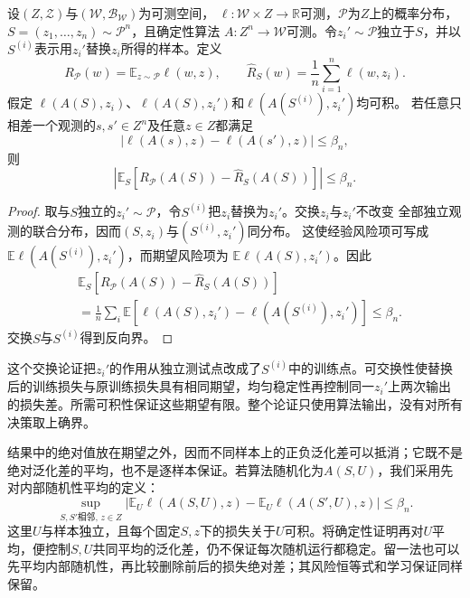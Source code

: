 \begin{theorem}[均匀稳定性与期望风险]
\label{thm:stability-expected-generalization}
设$(Z,\mathcal Z)$与$(\mathcal W,\mathcal B_{\mathcal W})$为可测空间，
$\ell:\mathcal W\times Z\to\mathbb R$可测，$\mathcal P$为$Z$上的概率分布，
$S=(z_1,\ldots,z_n)\sim\mathcal P^n$，且确定性算法
$A:Z^n\to\mathcal W$可测。令$z_i'\sim\mathcal P$独立于$S$，并以
$S^{(i)}$表示用$z_i'$替换$z_i$所得的样本。定义
\[
 R_{\mathcal P}(w)=\mathbb E_{z\sim\mathcal P}\ell(w,z),
 \qquad
 \hat R_S(w)=\frac1n\sum_{i=1}^n\ell(w,z_i).
\]
假定
$\ell(A(S),z_i)$、$\ell(A(S),z_i')$和$\ell(A(S^{(i)}),z_i')$均可积。
若任意只相差一个观测的$s,s'\in Z^n$及任意$z\in Z$都满足
\[
 |\ell(A(s),z)-\ell(A(s'),z)|\leq\beta_n,
\]
则
\begin{equation}
 \left|\mathbb E_S\left[R_{\mathcal P}(A(S))-\hat R_S(A(S))\right]\right|
 \leq\beta_n.
 \label{eq:stability-expectation-bound}
\end{equation}
\end{theorem}

\begin{proof}
取与$S$独立的$z_i'\sim\mathcal P$，令$S^{(i)}$把$z_i$替换为$z_i'$。交换$z_i$与$z_i'$不改变
全部独立观测的联合分布，因而$(S,z_i)$与$(S^{(i)},z_i')$同分布。
这使经验风险项可写成$\mathbb E\ell(A(S^{(i)}),z_i')$，而期望风险项为
$\mathbb E\ell(A(S),z_i')$。因此
\begin{align*}
 &\mathbb E_S[R_{\mathcal P}(A(S))-\hat R_S(A(S))]\\
 &=\frac1n\sum_i\mathbb E
   [\ell(A(S),z_i')-\ell(A(S^{(i)}),z_i')]
 \leq\beta_n.
\end{align*}
交换$S$与$S^{(i)}$得到反向界。

\end{proof}

这个交换论证把$z_i'$的作用从独立测试点改成了$S^{(i)}$中的训练点。可交换性使替换后的训练损失与原训练损失具有相同期望，均匀稳定性再控制同一$z_i'$上两次输出的损失差。所需可积性保证这些期望有限。整个论证只使用算法输出，没有对所有决策取上确界。

结果中的绝对值放在期望之外，因而不同样本上的正负泛化差可以抵消；它既不是绝对泛化差的平均，也不是逐样本保证。若算法随机化为$A(S,U)$，我们采用先对内部随机性平均的定义：
\[
 \sup_{S,S'\text{相邻},\,z\in Z}
 \left|\mathbb E_U\ell(A(S,U),z)-\mathbb E_U\ell(A(S',U),z)\right|\leq\beta_n.
\]
这里$U$与样本独立，且每个固定$S,z$下的损失关于$U$可积。将确定性证明再对$U$平均，便控制$S,U$共同平均的泛化差，仍不保证每次随机运行都稳定。留一法也可以先平均内部随机性，再比较删除前后的损失绝对差；其风险恒等式和学习保证同样保留。

